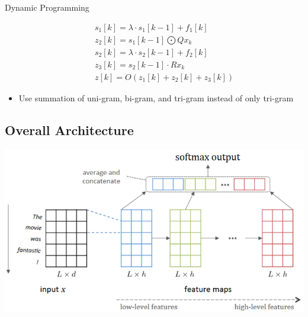 \documentclass[compress]{beamer}
\begin{document}
\begin{frame}[allowframebreaks]{\subsecname}
\begin{block}{Dynamic Programming}
\begin{itemize}
\begin{equation*}
\begin{aligned}
                            & s_1[k] = \lambda \cdot s_1[k-1] + f_1[k] \\
                            & z_2[k] = s_1[k-1] \bigodot Qx_k \\
                            & s_2[k] = \lambda \cdot s_2[k-1] + f_2[k]\\
                            & z_3[k] = s_2[k-1] \cdot Rx_k \\
                            & z[k]=O(z_1[k]+z_2[k]+z_3[k])
                        \end{aligned}
                    \end{equation*}
                    \item Use summation of uni-gram, bi-gram, and tri-gram instead of only tri-gram  
                \end{itemize}
            \end{block}
        \end{frame}
    \subsection{Overall Architecture}
        \begin{frame}{\subsecname}
      		\includegraphics[width=\textwidth]{molding_cnn.png}
        \end{frame}
        
\end{document}
